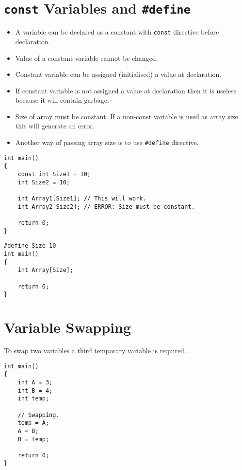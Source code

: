 \documentclass[12pt,a4paper]{article}
\begin{document}
\section{\texttt{const} Variables and \texttt{\#define}}
\begin{itemize}
\item A variable can be declared as a constant with \verb|const| directive before declaration.
\item Value of a constant variable cannot be changed.
\item Constant variable can be assigned (initialised) a value at declaration.
\item If constant variable is not assigned a value at declaration then it is useless because it will contain garbage.
\item Size of array must be constant. If a non-const variable is used as array size this will generate an error.
\item Another way of passing array size is to use \verb|#define| directive.
\end{itemize}
\begin{lstlisting}[caption={Using const as Array Size}]
int main()
{
	const int Size1 = 10;
	int Size2 = 10;
	
	int Array1[Size1]; // This will work.
	int Array2[Size2]; // ERROR: Size must be constant.

	return 0;
}
\end{lstlisting}
\begin{lstlisting}[caption={Using \#define to Declare Array Size}]
#define Size 10
int main()
{
	int Array[Size];

	return 0;
}
\end{lstlisting}
\section{Variable Swapping}
To swap two variables a third temporary variable is required.
\begin{lstlisting}[caption={Swapping Variables}]
int main()
{
	int A = 3;
	int B = 4;
	int temp;
	
	// Swapping.
	temp = A;
	A = B;
	B = temp;
	
	return 0;
}
\end{lstlisting}
\end{document}
